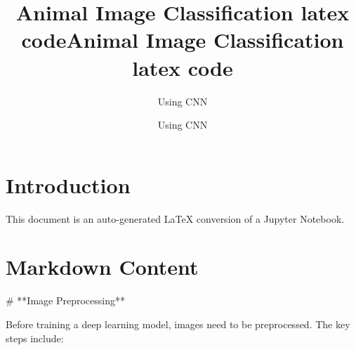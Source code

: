 \documentclass{article}
\title{Animal Image Classification latex code}
\author{Using CNN}
\date{}
\begin{document}
\maketitle

\section{Introduction}
This document is an auto-generated LaTeX conversion of a Jupyter Notebook.

\section{Markdown Content}
# **Image Preprocessing**

Before training a deep learning model, images need to be preprocessed. The key steps include:


\title{Animal Image Classification latex code}
\author{Using CNN}
\date{}
\end{document}
